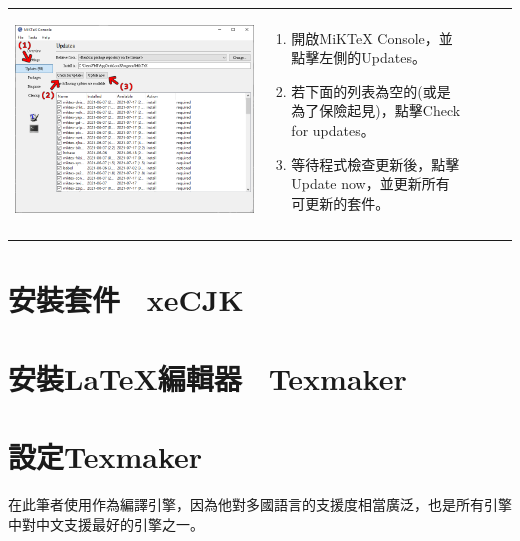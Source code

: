 \documentclass{../indiv}
\begin{document}
\begin{table}[H]
\begin{tabular}{T >{\ttfamily\large}p{2.5em} p{7.3cm} p{6.5cm} T}
\begin{tabmp}[-0.3]
				\includegraphics[width=\linewidth]{miktex-install-6.png}
			\end{tabmp} &
			\begin{tabmp}
				\begin{enumerate}[label=\texttt{(\arabic*)}, nosep, left=0pt, labelsep=0.5ex]
					\item 開啟MiKTeX Console，並點擊左側的Updates。
					\item 若下面的列表為空的(或是為了保險起見)，點擊Check for updates。
					\item 等待程式檢查更新後，點擊Update now，並更新所有可更新的套件。
				\end{enumerate}
			\end{tabmp}
			\\ \Thline
		\end{tabular}
		\label{tab:MiKTeX Installation}
	\end{table}
	
	\section{安裝套件 \textemdash\ xeCJK}
	
	\section{安裝\LaTeX 編輯器 \textemdash\ Texmaker}
	
	\section{設定Texmaker}
	在此筆者使用作為編譯引擎，因為他對多國語言的支援度相當廣泛，也是所有引擎中對中文支援最好的引擎之一。
\end{document}
